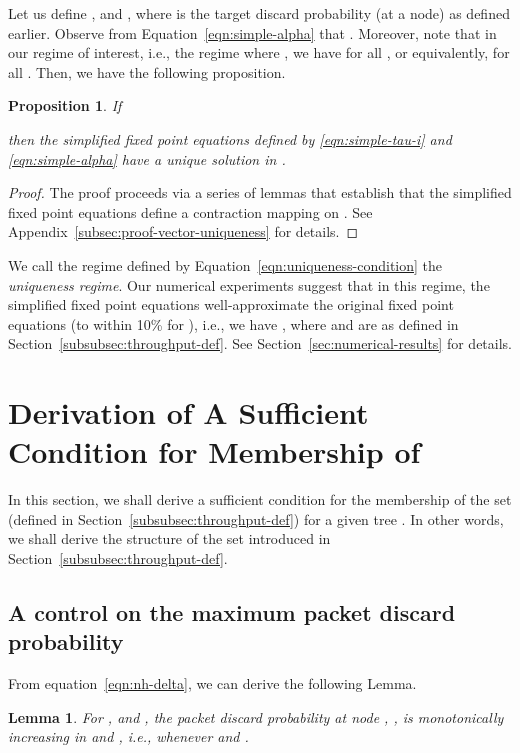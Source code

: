 \documentclass[12pt, draftclsnofoot, onecolumn]{IEEEtran}
\newtheorem{proposition}{Proposition}
\newtheorem{lemma}{Lemma}
\begin{document}
Let us define , and , where  is the target discard probability (at a node) as defined earlier. Observe from Equation~\eqref{eqn:simple-alpha} that . Moreover, note that in our regime of interest, i.e., the regime where , we have  for all , or equivalently,  for all . Then, we have the following proposition. 

\begin{proposition}
\label{prop:vector-uniqueness}
If 

then the simplified fixed point equations defined by \eqref{eqn:simple-tau-i} and \eqref{eqn:simple-alpha} have a unique solution  in . 
\end{proposition}

\begin{proof}
The proof proceeds via a series of lemmas that establish that the simplified fixed point equations define a contraction mapping on . See Appendix~\ref{subsec:proof-vector-uniqueness} for details. 
\end{proof}

We call the regime defined by Equation~\eqref{eqn:uniqueness-condition} the \emph{uniqueness regime}. Our numerical experiments suggest that in this regime, the simplified fixed point equations well-approximate the original fixed point equations (to within 10\% for ), i.e., we have , where  and  are as defined in Section~\ref{subsubsec:throughput-def}. See Section~\ref{sec:numerical-results} for details. 

\section{Derivation of A Sufficient Condition for Membership of }
\label{sec:arguments-leading-to-thm2}

In this section, we shall derive a sufficient condition for the membership of the set  (defined in Section~\ref{subsubsec:throughput-def}) for a given tree . In other words, we shall derive the structure of the set  introduced in Section~\ref{subsubsec:throughput-def}. 

\subsection{A control on the maximum packet discard probability}
From equation~\eqref{eqn:nh-delta}, we can derive the following Lemma.

\begin{lemma}
\label{lem:delta-inc-alpha-gamma}
For , and , the packet discard probability at node , , is monotonically increasing in  and , i.e.,  whenever  and .
\end{lemma}
\end{document}
